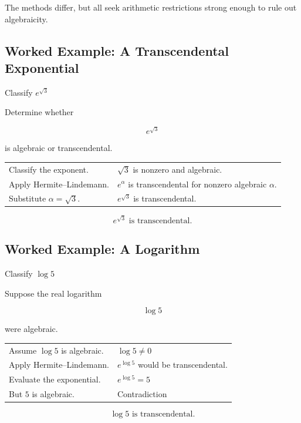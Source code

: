 The methods differ, but all seek arithmetic restrictions strong enough to
rule out algebraicity.

\subsection{Worked Example: A Transcendental Exponential}
\label{subsec:worked-transcendental-exponential}

\begin{workedexamplebox}{Classify \(e^{\sqrt3}\)}

Determine whether

\[ e^{\sqrt3} \]

is algebraic or transcendental.

\begin{tabularx}{\textwidth}{@{}>{\raggedright\arraybackslash}p{}X@{}}
Classify the exponent. & \(\sqrt3\) is nonzero and algebraic.\\
Apply Hermite--Lindemann. & \(e^\alpha\) is transcendental for nonzero algebraic \(\alpha\).\\
Substitute \(\alpha=\sqrt3\). & \(e^{\sqrt3}\) is transcendental.
\end{tabularx}

\begin{answerbox}
\[ \boxed{e^{\sqrt3}\text{ is transcendental}.} \]
\end{answerbox}
\end{workedexamplebox}

\subsection{Worked Example: A Logarithm}
\label{subsec:worked-transcendental-logarithm}

\begin{workedexamplebox}{Classify \(\log 5\)}

Suppose the real logarithm

\[ \log5 \]

were algebraic.

\begin{tabularx}{\textwidth}{@{}>{\raggedright\arraybackslash}p{}X@{}}
Assume \(\log5\) is algebraic. & \(\log5\neq0\)\\
Apply Hermite--Lindemann. & \(e^{\log5}\) would be transcendental.\\
Evaluate the exponential. & \(e^{\log5}=5\)\\
But \(5\) is algebraic. & Contradiction
\end{tabularx}

\begin{answerbox}
\[ \boxed{\log5\text{ is transcendental}.} \]
\end{answerbox}
\end{workedexamplebox}

